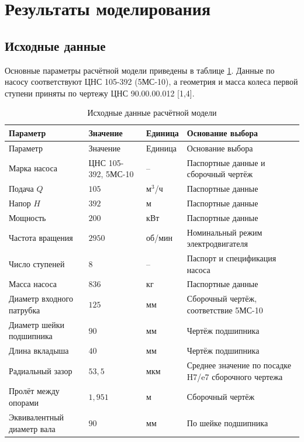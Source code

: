 \documentclass[14pt,a4paper]{extarticle}
\numberwithin{equation}{section}
\numberwithin{figure}{section}
\numberwithin{table}{section}
\begin{document}
\section{Результаты моделирования}

\subsection{Исходные данные}

Основные параметры расчётной модели приведены в таблице \ref{tab:input_params}. Данные по насосу соответствуют ЦНС 105-392 (5МС-10), а геометрия и масса колеса первой ступени приняты по чертежу ЦНС 90.00.00.012 [1,4].

\begin{longtable}{|p{}|p{}|p{}|p{}|}
\caption{Исходные данные расчётной модели}\label{tab:input_params}\\
\hline
Параметр & Значение & Единица & Основание выбора \\
\hline
\endfirsthead
\hline
Параметр & Значение & Единица & Основание выбора \\
\hline
\endhead
Марка насоса & ЦНС 105-392, 5МС-10 & -- & Паспортные данные и сборочный чертёж \\
\hline
Подача $Q$ & $105$ & м$^3$/ч & Паспортные данные \\
\hline
Напор $H$ & $392$ & м & Паспортные данные \\
\hline
Мощность & $200$ & кВт & Паспортные данные \\
\hline
Частота вращения & $2950$ & об/мин & Номинальный режим электродвигателя \\
\hline
Число ступеней & $8$ & -- & Паспорт и спецификация насоса \\
\hline
Масса насоса & $836$ & кг & Паспортные данные \\
\hline
Диаметр входного патрубка & $125$ & мм & Сборочный чертёж, соответствие 5МС-10 \\
\hline
Диаметр шейки подшипника & $90$ & мм & Чертёж подшипника \\
\hline
Длина вкладыша & $40$ & мм & Чертёж подшипника \\
\hline
Радиальный зазор & $53{,}5$ & мкм & Среднее значение по посадке H7/e7 сборочного чертежа \\
\hline
Пролёт между опорами & $1{,}951$ & м & Сборочный чертёж \\
\hline
Эквивалентный диаметр вала & $90$ & мм & По шейке подшипника \\

\end{longtable}
\end{document}
